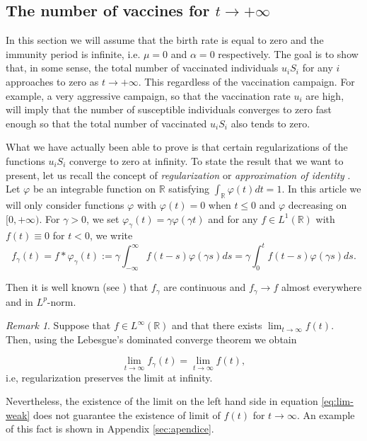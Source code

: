 \documentclass[a4paper,10pt]{article}
\theoremstyle{remark}
\newtheorem{comentario}{Remark}
\begin{document}
\subsection{The number of vaccines  for  $t\to +\infty$}

In this section we will assume that the birth rate is equal to zero and the immunity period is infinite, i.e. $\mu=0$ and $\alpha=0$ respectively.
The goal  is to show that, in some sense, the total number of vaccinated individuals $u_iS_i$ for any $i$ approaches to zero as $t\to+\infty$. This regardless of the vaccination campaign. For example, a very aggressive campaign, so that the vaccination rate $u_i$ are high, will imply that the number of susceptible individuals converges to zero fast enough so that the total number of vaccinated $u_iS_i$ also tends to zero.

What we have actually been able to prove is that certain regularizations of the functions $u_iS_i$ converge to zero at infinity. To state the result that we want to present, let us recall the concept of \emph{regularization} or \emph{approximation of identity}  \cite{EliasM.Stein120}. Let $\varphi$ be an  integrable function on $\mathbb{R}$ satisfying $\int_\mathbb{R}\varphi(t)dt=1$.  In this article we will only consider functions $\varphi$  with $\varphi(t)=0$ when $t\leq 0$ and $\varphi$ decreasing on $[0,+\infty)$. For $\gamma>0$, we set $\varphi_\gamma(t)=\gamma\varphi(\gamma t)$ and for any $f\in L^1(\mathbb{R})$ with $f(t)\equiv 0$ for $t<0$, we write
\[
 f_{\gamma}(t)=f\ast \varphi_\gamma (t):= \gamma\int_{-\infty}^\infty f(t-s)\varphi(\gamma s)ds= \gamma\int_0^t f(t-s)\varphi(\gamma s)ds. 
\]

Then it is well known (see \cite{EliasM.Stein120})
that $f_\gamma$ are continuous and  $f_\gamma\to f$  almost everywhere and in $L^p$-norm.  

\begin{comentario}
 Suppose that $f\in L^\infty(\mathbb{R})$ and that there exists  $\lim_{t\to\infty}f(t)$.   Then, using the Lebesgue's dominated converge theorem we obtain

 \begin{equation}\label{eq:lim-weak}
 \lim_{t\to\infty}f_\gamma(t) =\lim_{t\to\infty}f(t),
\end{equation}
i.e,  regularization preserves the limit at infinity.

Nevertheless, the existence of the limit on the left hand side in equation \eqref{eq:lim-weak}   does not guarantee the existence of limit of $f(t)$ for $t\to\infty$. An example of this fact is shown in Appendix \ref{sec:apendice}.
\end{comentario}
\end{document}
